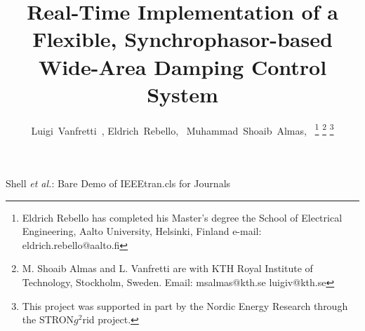 \documentclass[journal]{IEEEtran}
\begin{document}
%
\title{Real-Time Implementation of a Flexible, Synchrophasor-based Wide-Area Damping Control System}
%
%
%


\author{Luigi~Vanfretti~, Eldrich~Rebello,~
        Muhammad~Shoaib~Almas,~
\thanks{Eldrich Rebello has completed his Master's degree the School of Electrical Engineering, Aalto University, Helsinki, Finland
e-mail: eldrich.rebello@aalto.fi}%
\thanks{M. Shoaib Almas and L. Vanfretti are with KTH Royal Institute of Technology, Stockholm, Sweden. Email: msalmas@kth.se luigiv@kth.se}%
\thanks{This project was supported in part by the Nordic
Energy Research through the STRON$g^{2}$rid project.}}

% 
%



%
{Shell \MakeLowercase{\textit{et al.}}: Bare Demo of IEEEtran.cls for Journals}
% 
\end{document}
